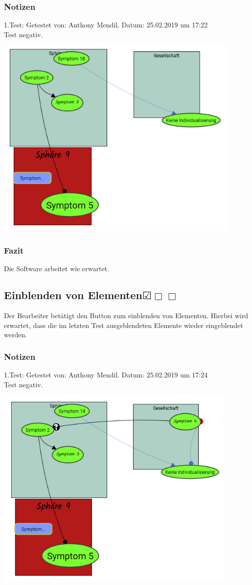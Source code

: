 \documentclass{scrartcl}
\newcommand{\subsectiont}[2]{\subsection[#1]{#1{\normalsize\normalfont #2}}}
\newcommand{\leer}{$\Box$}
\newcommand{\ok}{$\CheckedBox$}
\begin{document}
\subsubsection{Notizen}
1.Test: Getestet von: Anthony Mendil. Datum: 25.02.2019 um 17:22 \\
Test negativ. 
\begin{center}
\includegraphics[height=10cm]{3_53ausgeblendet.PNG}
\end{center}
\subsubsection{Fazit}
Die Software arbeitet wie erwartet.

\subsectiont{Einblenden von Elementen}{\dotfill\ok\leer\leer}
Der Bearbeiter betätigt den Button zum einblenden von Elementen. Hierbei wird erwartet, dass die im letzten Test ausgeblendeten Elemente wieder eingeblendet werden. 
\subsubsection{Notizen}
1.Test: Getestet von: Anthony Mendil. Datum: 25.02.2019 um 17:24 \\
Test negativ. 
\begin{center}
\includegraphics[height=10cm]{3_54.PNG}
\end{center}
\end{document}
